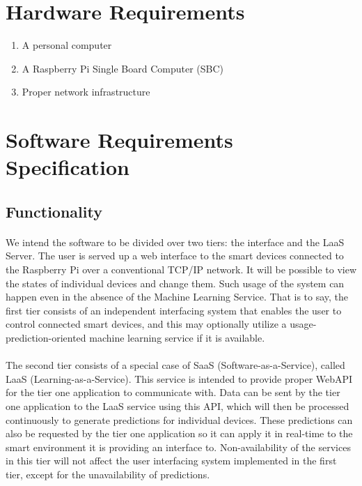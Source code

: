 \section{Hardware Requirements}

\begin{enumerate}
\item A personal computer
\item A Raspberry Pi Single Board Computer (SBC)
\item Proper network infrastructure
\end{enumerate}

\pagebreak

\section{Software Requirements Specification}

\subsection{Functionality}
\paragraph{}
We intend the software to be divided over two tiers: the interface and the LaaS Server. The user is served up a web interface to the smart devices connected to the Raspberry Pi over a conventional TCP/IP network. It will be possible to view the states of individual devices and change them. Such usage of the system can happen even in the absence of the Machine Learning Service. That is to say, the first tier consists of an independent interfacing system that enables the user to control connected smart devices, and this may optionally utilize a usage-prediction-oriented machine learning service if it is available.
\paragraph{}
The second tier consists of a special case of SaaS (Software-as-a-Service), called LaaS (Learning-as-a-Service). This service is intended to provide proper WebAPI for the tier one application to communicate with. Data can be sent by the tier one application to the LaaS service using this API, which will then be processed continuously to generate predictions for individual devices. These predictions can also be requested by the tier one application so it can apply it in real-time to the smart environment it is providing an interface to. Non-availability of the services in this tier will not affect the user interfacing system implemented in the first tier, except for the unavailability of predictions.
